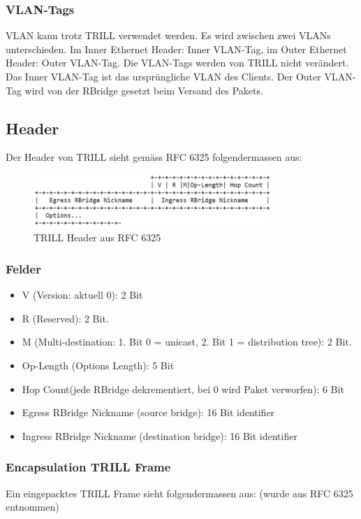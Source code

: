 \documentclass[a4,12pt]{scrartcl}
\begin{document}
\subsubsection{VLAN-Tags}
VLAN kann trotz TRILL verwendet werden. Es wird zwischen zwei VLANs unterschieden. Im Inner Ethernet Header: Inner VLAN-Tag, im Outer Ethernet Header: Outer VLAN-Tag. Die VLAN-Tags werden von TRILL nicht verändert. Das Inner VLAN-Tag ist das ursprüngliche VLAN des Clients. Der Outer VLAN-Tag wird von der RBridge gesetzt beim Versand des Pakets. 

\subsection{Header}
Der Header von TRILL sieht gemäss RFC 6325 folgendermassen aus: 

\begin{figure} [H]
	\begin{center}
	\includegraphics[width=0.80\textwidth]{./pictures/trill_header.png}
	\caption{TRILL Header aus RFC 6325}
	\label{x}
	\end{center}
\end{figure}
\newpage

\subsubsection{Felder}
\begin{itemize}
\item V (Version: aktuell 0): 2 Bit
\item R (Reserved): 2 Bit.
\item M (Multi-destination: 1. Bit 0 = unicast, 2. Bit 1 = distribution tree): 2 Bit.
\item Op-Length (Options Length): 5 Bit
\item Hop Count(jede RBridge dekrementiert, bei 0 wird Paket verworfen): 6 Bit
\item Egress RBridge Nickname (source bridge): 16 Bit identifier
\item Ingress RBridge Nickname (destination bridge): 16 Bit identifier
\end{itemize}

\subsubsection{Encapsulation TRILL Frame}
Ein eingepacktes TRILL Frame sieht folgendermassen aus: (wurde aus RFC 6325 entnommen) 
\end{document}
